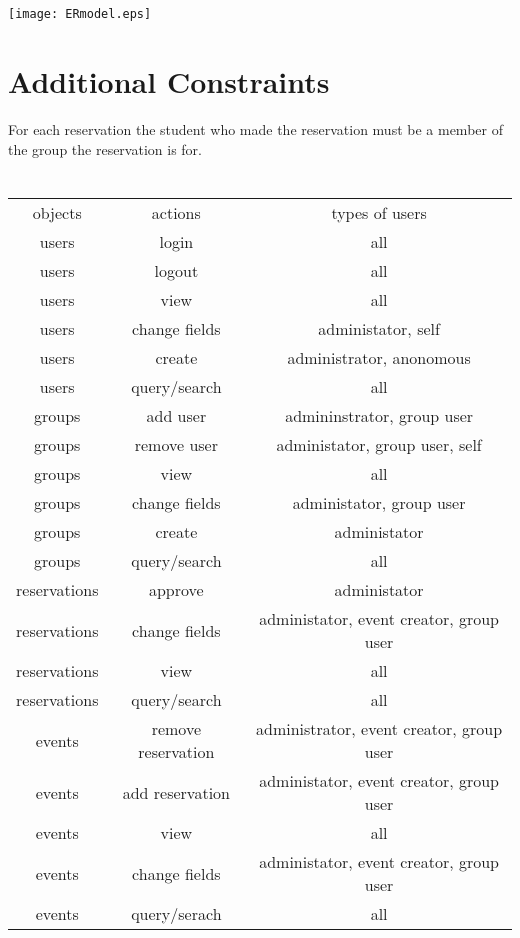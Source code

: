 \documentclass{article}
\begin{document}
\section{}
\texttt{[image: ERmodel.eps]}

\section{Additional Constraints}
For each reservation the student who made the reservation must be a member of
the group the reservation is for. 

\section{}

\begin{tabular}{ccc}
 objects & actions & types of users\\
 users & login & all \\
users & logout & all \\
users & view & all \\
users & change fields & administator, self \\
users & create & administrator, anonomous \\
users & query/search & all \\
groups & add user & admininstrator, group user\\
groups & remove user & administator, group user, self\\ 
groups & view & all\\
groups & change fields & administator, group user\\
groups & create & administator \\
groups & query/search & all \\
reservations & approve & administator \\
reservations & change fields & administator, event creator, group user \\
reservations & view & all \\
reservations & query/search & all \\
events & remove reservation & administrator, event creator, group user \\
events & add reservation & administator, event creator, group user\\
events & view & all \\
events & change fields & administator, event creator, group user \\
events & query/serach & all \\
\end{tabular}
\end{document}
